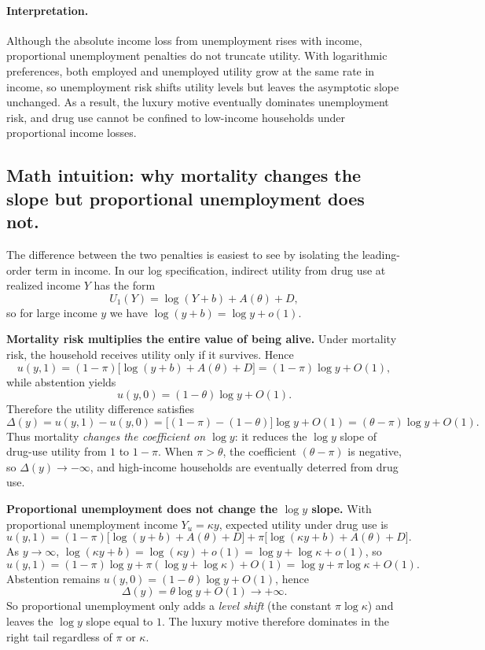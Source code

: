 \documentclass[parskip=full]{article}
\theoremstyle{plain}      %
\theoremstyle{remark}    %
\begin{document}
\paragraph{Interpretation.}
Although the absolute income loss from unemployment rises with income, proportional unemployment penalties do not truncate utility. With logarithmic preferences, both employed and unemployed utility grow at the same rate in income, so unemployment risk shifts utility levels but leaves the asymptotic slope unchanged. As a result, the luxury motive eventually dominates unemployment risk, and drug use cannot be confined to low-income households under proportional income losses.

\subsection{Math intuition: why mortality changes the slope but proportional unemployment does not.}
The difference between the two penalties is easiest to see by isolating the leading-order term in income.
In our log specification, indirect utility from drug use at realized income $Y$ has the form
\[U_1(Y)=\log(Y+b)+A(\theta)+D,\]
so for large income $y$ we have $\log(y+b)=\log y+o(1)$.

\medskip
\noindent\textbf{Mortality risk multiplies the entire value of being alive.}
Under mortality risk, the household receives utility only if it survives. Hence
\[u(y,1)=(1-\pi)\big[\log(y+b)+A(\theta)+D\big]=(1-\pi)\log y + O(1),\]
while abstention yields
\[u(y,0)=(1-\theta)\log y + O(1).\]
Therefore the utility difference satisfies
\[\Delta(y)=u(y,1)-u(y,0)=\big[(1-\pi)-(1-\theta)\big]\log y + O(1)=(\theta-\pi)\log y + O(1).\]
Thus mortality \emph{changes the coefficient on $\log y$}: it reduces the $\log y$ slope of drug-use utility
from $1$ to $1-\pi$. When $\pi>\theta$, the coefficient $(\theta-\pi)$ is negative, so $\Delta(y)\to -\infty$,
and high-income households are eventually deterred from drug use.

\medskip
\noindent\textbf{Proportional unemployment does not change the $\log y$ slope.}
With proportional unemployment income $Y_u=\kappa y$, expected utility under drug use is
\[u(y,1)=(1-\pi)\big[\log(y+b)+A(\theta)+D\big]+\pi\big[\log(\kappa y+b)+A(\theta)+D\big].\]
As $y\to\infty$, $\log(\kappa y+b)=\log(\kappa y)+o(1)=\log y+\log\kappa+o(1)$, so
\[u(y,1)=(1-\pi)\log y+\pi(\log y+\log\kappa)+O(1)=\log y+\pi\log\kappa+O(1).\]
Abstention remains $u(y,0)=(1-\theta)\log y+O(1)$, hence
\[\Delta(y)=\theta\log y + O(1)\to +\infty.\]
So proportional unemployment only adds a \emph{level shift} (the constant $\pi\log\kappa$) and leaves the
$\log y$ slope equal to $1$. The luxury motive therefore dominates in the right tail regardless of $\pi$ or $\kappa$.
\end{document}

